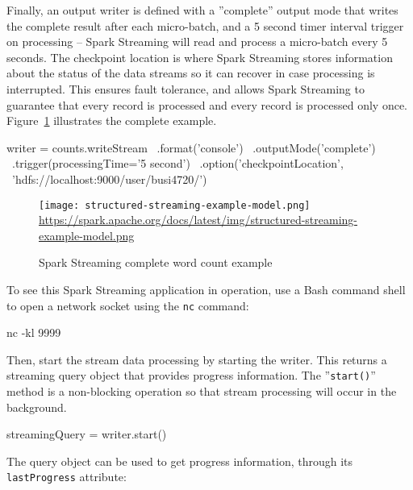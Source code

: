 Finally, an output writer is defined with a ''complete'' output mode that writes the complete result after each micro-batch, and a 5 second timer interval trigger on processing -- Spark Streaming will read and process a micro-batch every 5 seconds. The checkpoint location is where Spark Streaming stores information about the status of the data streams so it can recover in case processing is interrupted. This ensures fault tolerance, and allows Spark Streaming to guarantee that every record is processed and every record is processed only once. Figure~\ref{fig:streamingexample} illustrates the complete example.

\begin{samepage}
\begin{pythoncode}
writer = counts.writeStream \
           .format('console') \
           .outputMode('complete') \
           .trigger(processingTime='5 second') \
           .option('checkpointLocation', \
               'hdfs://localhost:9000/user/busi4720/')
\end{pythoncode}
\end{samepage}

\begin{figure}
\centering

\texttt{[image: structured-streaming-example-model.png]} \\

\scriptsize\url{https://spark.apache.org/docs/latest/img/structured-streaming-example-model.png}
\caption{Spark Streaming complete word count example}
\label{fig:streamingexample}
\end{figure}

To see this Spark Streaming application in operation, use a Bash command shell to open a network socket using the \texttt{nc} command:

\begin{bashcode}
nc -kl 9999
\end{bashcode}

Then, start the stream data processing by starting the writer. This returns a streaming query object that provides progress information. The ''\texttt{start()}'' method is a non-blocking operation so that stream processing will occur in the background.

\begin{pythoncode}
streamingQuery = writer.start()
\end{pythoncode}

The query object can be used to get progress information, through its \texttt{lastProgress} attribute:

